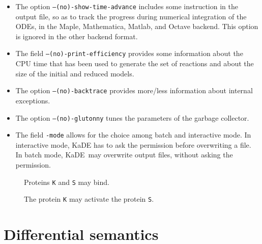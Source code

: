 \documentclass[11pt]{book}
\def\KaDE{\textsf{KaDE}}
\begin{document}
\begin{itemize}
\item The option \texttt{--(no)-show-time-advance} includes some
instruction in the output file, so as to track the progress during numerical integration of the ODEs, in the Maple, Mathematica, Matlab, and Octave backend.
This option is ignored in the other backend format.

\item The field \texttt{--(no)-print-efficiency} provides some information about the CPU time that has been used to generate the set of reactions and about the size of the initial and reduced models.

\item The option \texttt{--(no)-backtrace} provides more/less information about internal exceptions.
\item The option \texttt{--(no)-glutonny} tunes the parameters of the garbage collector.
\item The field \texttt{-mode} allows for the choice among batch and interactive mode. In interactive mode, {\KaDE} has to ask the permission before overwriting a file. In batch mode, {\KaDE} may overwrite output files, without asking the permission.
\end{itemize}

\begin{figure}[t]
\begin{minipage}{\linewidth}
    \centering{}
  \end{minipage}
  \caption{Proteins \texttt{K} and \texttt{S} may bind. }
  \label{fig:sec1:bind}
\end{figure}
\begin{figure}[t]
\begin{minipage}{\linewidth}
\centering{}
\end{minipage}
\caption{The protein \texttt{K} may activate the protein \texttt{S}.}
\label{fig:sec1:phos}
\end{figure}

\section{Differential semantics}
\label{sec:differential semantics}
\end{document}
